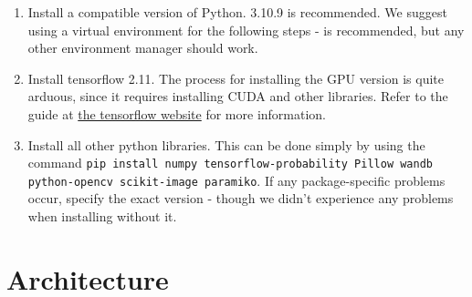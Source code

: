 \begin{enumerate}
    \item Install a compatible version of Python. 3.10.9 is recommended. We suggest using a virtual environment for the following steps - \cite{anaconda} is recommended, but any other environment manager should work.
    \item Install tensorflow 2.11. The process for installing the GPU version is quite arduous, since it requires installing CUDA and other libraries. Refer to the guide at \href{https://www.tensorflow.org/install}{the tensorflow website} for more information.
    \item Install all other python libraries. This can be done simply by using the command \texttt{pip install numpy tensorflow-probability Pillow wandb python-opencv scikit-image paramiko}. If any package-specific problems occur, specify the exact version - though we didn't experience any problems when installing without it.
\end{enumerate}


\section{Architecture}

